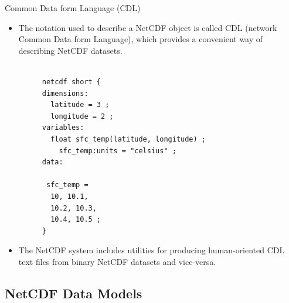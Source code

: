 \documentclass[compress,11pt,xcolor=svgnames,aspectratio=169]{beamer}
\begin{document}
\begin{frame}[fragile]{Common Data form Language (CDL)}

\begin{itemize}
\setlength\itemsep{0.3cm}

\item The notation used to describe a NetCDF object is called CDL (network Common Data form Language), which provides a convenient way of describing NetCDF datasets.

\begin{figure}
\centering
\begin{varwidth}{\linewidth}
\tiny{

\begin{verbatim}

netcdf short {
dimensions:
  latitude = 3 ;
  longitude = 2 ;
variables:
  float sfc_temp(latitude, longitude) ;
    sfc_temp:units = "celsius" ;
data:

 sfc_temp =
  10, 10.1,
  10.2, 10.3,
  10.4, 10.5 ;
}

\end{verbatim}
}
\end{varwidth}
\end{figure}

\item The NetCDF system includes utilities for producing human-oriented CDL text files from binary NetCDF datasets and vice-versa.

\end{itemize}

\nocite{netcdf}

\end{frame}

\subsection{NetCDF Data Models}
\end{document}
